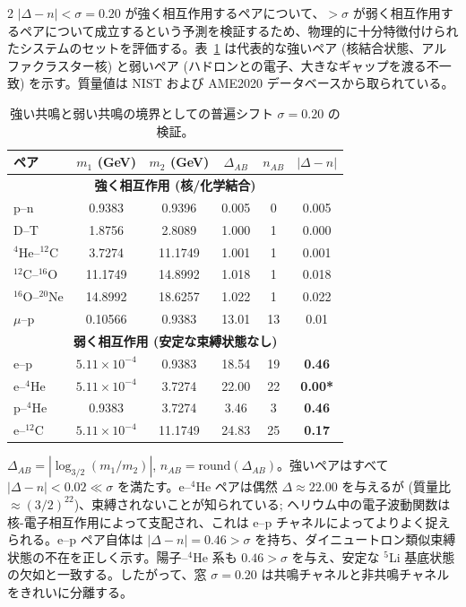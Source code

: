 \documentclass[11pt,a4paper]{article}
\theoremstyle{remark}
\begin{document}
\begin{multicols}{2}
		$|\Delta - n| < \sigma = 0.20$ が強く相互作用するペアについて、$> \sigma$ が弱く相互作用するペアについて成立するという予測を検証するため、物理的に十分特徴付けられたシステムのセットを評価する。表~\ref{tab:sigma_validation} は代表的な強いペア (核結合状態、アルファクラスター核) と弱いペア (ハドロンとの電子、大きなギャップを渡る不一致) を示す。質量値は NIST および AME2020 データベースから取られている。
		
		\begin{table}[H]
			\centering
			\caption{強い共鳴と弱い共鳴の境界としての普遍シフト \(\sigma = 0.20\) の検証。}
			\label{tab:sigma_validation}
			\small
			\begin{tabular}{l c c c c c}
				\toprule
				ペア & $m_1$ (GeV) & $m_2$ (GeV) & $\Delta_{AB}$ & $n_{AB}$ & $|\Delta - n|$ \\
				\midrule
				\multicolumn{6}{c}{\textbf{強く相互作用 (核/化学結合)}} \\
				p--n           & 0.9383 & 0.9396 & 0.005  & 0 & 0.005 \\
				D--T           & 1.8756 & 2.8089 & 1.000  & 1 & 0.000 \\
				$^4$He--$^{12}$C  & 3.7274 & 11.1749 & 1.001  & 1 & 0.001 \\
				$^{12}$C--$^{16}$O & 11.1749& 14.8992 & 1.018  & 1 & 0.018 \\
				$^{16}$O--$^{20}$Ne& 14.8992& 18.6257 & 1.022  & 1 & 0.022 \\
				$\mu$--p        & 0.10566& 0.9383 & 13.01  &13 & 0.01  \\
				\midrule
				\multicolumn{6}{c}{\textbf{弱く相互作用 (安定な束縛状態なし)}} \\
				e--p           & $5.11\times10^{-4}$ & 0.9383 & 18.54 & 19 & \textbf{0.46} \\
				e--$^4$He      & $5.11\times10^{-4}$ & 3.7274 & 22.00 & 22 & \textbf{0.00*} \\
				p--$^4$He      & 0.9383 & 3.7274 & 3.46  & 3  & \textbf{0.46} \\
				e--$^{12}$C    & $5.11\times10^{-4}$ & 11.1749& 24.83 & 25 & \textbf{0.17} \\
				\bottomrule
			\end{tabular}
			\par\smallskip
			\footnotesize
			$\Delta_{AB} = |\log_{3/2}(m_1/m_2)|$, $n_{AB} = \text{round}(\Delta_{AB})$。強いペアはすべて $|\Delta - n| < 0.02 \ll \sigma$ を満たす。e--$^4$He ペアは偶然 $\Delta \approx 22.00$ を与えるが (質量比 $\approx (3/2)^{22}$)、束縛されないことが知られている; ヘリウム中の電子波動関数は核-電子相互作用によって支配され、これは e--p チャネルによってよりよく捉えられる。e--p ペア自体は $|\Delta - n| = 0.46 > \sigma$ を持ち、ダイニュートロン類似束縛状態の不在を正しく示す。陽子--$^4$He 系も $0.46 > \sigma$ を与え、安定な $^5$Li 基底状態の欠如と一致する。したがって、窓 $\sigma = 0.20$ は共鳴チャネルと非共鳴チャネルをきれいに分離する。
		\end{table}
		

\end{multicols}
\end{document}
